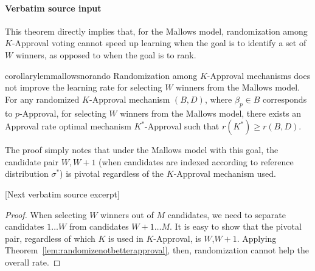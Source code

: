 \documentclass[10pt]{article}
\begin{document}
\paragraph{Verbatim source input}
\begin{ReviewVerbatim}
This theorem directly implies that, for the Mallows model, randomization among $K$-Approval voting cannot speed up learning when the goal is to identify a set of $W$ winners, as opposed to when the goal is to rank.

\begin{restatable}{corollary}{lemmallowsnorando}
	\label{lem:mallowsnorando}
			Randomization among $K$-Approval mechanisms does not improve the learning rate for selecting $W$ winners from the Mallows model. For any randomized $K$-Approval mechanism $(B,D)$, where $\beta_p\in B$ corresponds to $p$-Approval, for selecting $W$ winners from the Mallows model, there exists an Approval rate optimal mechanism $K^*$-Approval such that $r(K^*) \geq r(B,D)$.

\end{restatable}

The proof simply notes that under the Mallows model with this goal, the candidate pair $W, W+1$ (when candidates are indexed according to reference distribution $\sigma^*$) is pivotal regardless of the $K$-Approval mechanism used.

[Next verbatim source excerpt]

\lemmallowsnorando*
\begin{proof}
	When selecting $W$ winners out of $M$ candidates, we need to separate candidates $1 \dots W$ from candidates $W + 1 \dots M$. It is easy to show that the pivotal pair, regardless of which $K$ is used in $K$-Approval, is $W$,$W+1$. Applying Theorem~\ref{lem:randomizenotbetterapproval}, then, randomization cannot help the overall rate.
\end{proof}
\end{ReviewVerbatim}
\end{document}
